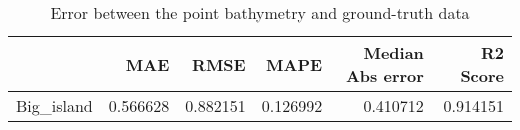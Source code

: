 \begin{table}[h!]
\caption{Error between the point bathymetry and ground-truth data}
\label{tab:Big_island_lidar_error}
\begin{tabular}{lrrrrr}
\toprule
 & MAE & RMSE & MAPE & Median Abs error & R2 Score \\
\midrule
Big_island & 0.566628 & 0.882151 & 0.126992 & 0.410712 & 0.914151 \\
\bottomrule
\end{tabular}
\end{table}
